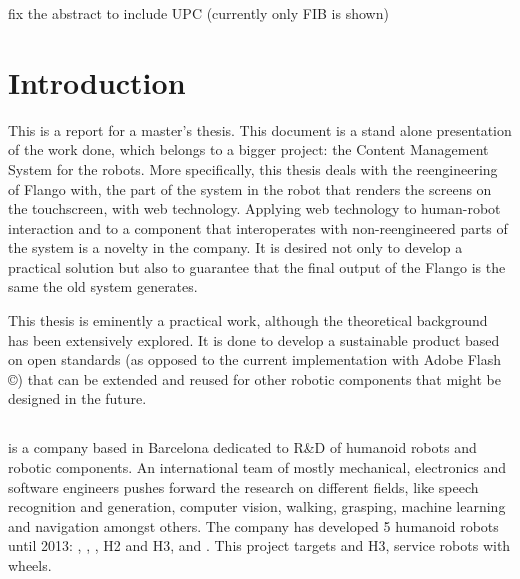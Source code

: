 
fix the abstract to include UPC (currently only FIB is shown)
\nocite{Stefanov} \nocite{Crockford} \nocite{Darwin} \nocite{AngularJSGuide} 

\chapter{Introduction}
This is a report for a master's thesis.
This document is a stand alone presentation of the work done, which belongs to a bigger project: the Content Management System for the robots.
More specifically, this thesis deals with the reengineering of Flango \cm with, the part of the system in the robot that renders the screens on the touchscreen, with web technology.
Applying web technology to human-robot interaction and to a component that interoperates with non-reengineered parts of the system is a novelty in the company.
It is desired not only to develop a practical solution but also to guarantee that the final output of the Flango \cm is the same the old system generates.

This thesis is eminently a practical work, although the theoretical background has been extensively explored. 
It is done to develop a sustainable product based on open standards (as opposed to the current implementation with Adobe Flash \copyright) that can be extended and reused for other robotic components that might be designed in the future.

\section{\company}
\company is a company based in Barcelona dedicated to R\&D of humanoid robots and robotic components. 
An international team of mostly mechanical, electronics and software engineers pushes forward the research on different fields, like speech recognition and generation, computer vision, walking, grasping, machine learning and navigation amongst others.
The company has developed 5 humanoid robots until 2013: , , , H2 and H3, and .
This project targets  and H3, service robots with wheels.

